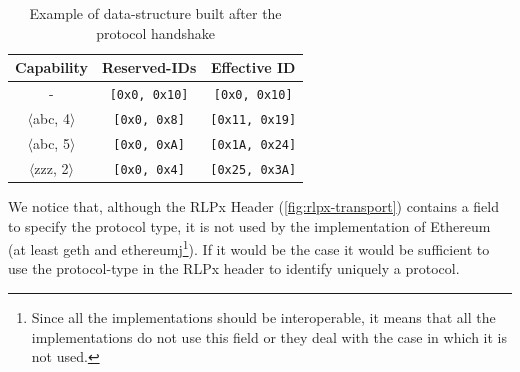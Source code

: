 \begin{table}
  \begin{center}
    \begin{tabular}{c | c | c }
      Capability & Reserved-IDs & Effective ID\\
      \hline
      - & \texttt{[0x0, 0x10]} & \texttt{[0x0, 0x10]} \\
      $\langle$abc, 4$\rangle$ & \texttt{[0x0, 0x8]} & \texttt{[0x11, 0x19]}  \\
      $\langle$abc, 5$\rangle$ & \texttt{[0x0, 0xA]} & \texttt{[0x1A, 0x24]}  \\
      $\langle$zzz, 2$\rangle$ & \texttt{[0x0, 0x4]}  & \texttt{[0x25,
      0x3A]}
    \end{tabular}
    \caption{Example of data-structure built after the protocol handshake}
    \label{table:capabilities}
  \end{center}
\end{table}

We notice that, although the RLPx Header (\autoref{fig:rlpx-transport}) contains
a field to specify the protocol type, it is not used by the implementation of
Ethereum (at least geth and ethereumj\footnote{Since all the implementations
should be interoperable, it means that all the implementations do not use this
field or they deal with the case in which it is not used.}). If it would be the
case it would be sufficient to use the protocol-type in the RLPx header to
identify uniquely a protocol.
